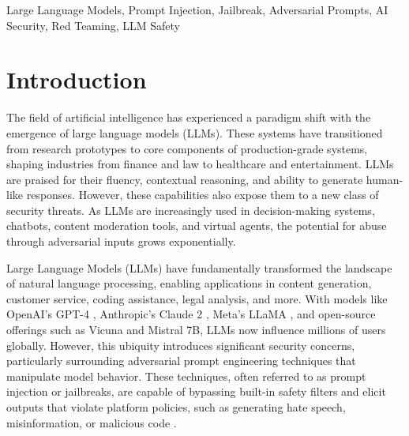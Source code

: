 \documentclass[conference]{IEEEtran}
\begin{document}
\begin{abstract}
Large Language Models (LLMs) are increasingly integrated into consumer and enterprise applications. Despite their capabilities, they remain susceptible to adversarial attacks such as prompt injection and jailbreaks that override alignment safeguards. This paper provides a systematic investigation of jailbreak strategies against various state-of-the-art LLMs. We categorize over 1,400 adversarial prompts, analyze their success against GPT-4, Claude 2, Mistral 7B, and Vicuna, and examine their generalizability and construction logic. We further propose layered mitigation strategies and recommend a hybrid red-teaming and sandboxing approach for robust LLM security.
\end{abstract}
\begin{IEEEkeywords}
 Large Language Models, Prompt Injection, Jailbreak, Adversarial Prompts, AI Security, Red Teaming, LLM Safety
\end{IEEEkeywords}

\section{Introduction}
The field of artificial intelligence has experienced a paradigm shift with the emergence of large language models (LLMs). These systems have transitioned from research prototypes to core components of production-grade systems, shaping industries from finance and law to healthcare and entertainment. LLMs are praised for their fluency, contextual reasoning, and ability to generate human-like responses. However, these capabilities also expose them to a new class of security threats. As LLMs are increasingly used in decision-making systems, chatbots, content moderation tools, and virtual agents, the potential for abuse through adversarial inputs grows exponentially. 

Large Language Models (LLMs) have fundamentally transformed the landscape of natural language processing, enabling applications in content generation, customer service, coding assistance, legal analysis, and more. With models like OpenAI's GPT-4 \cite{technicalreport17}, Anthropic’s Claude 2 \cite{anthropicjail18}, Meta’s LLaMA \cite{touvron2023llama50}, and open-source offerings such as Vicuna\cite{vicuna2023_51} and Mistral 7B\cite{mistral7b52}, LLMs now influence millions of users globally. However, this ubiquity introduces significant security concerns, particularly surrounding adversarial prompt engineering techniques that manipulate model behavior. These techniques, often referred to as prompt injection or jailbreaks, are capable of bypassing built-in safety filters and elicit outputs that violate platform policies, such as generating hate speech, misinformation, or malicious code \cite{liu2024promptinjection1}\cite{liu2024jailbreaking2}\cite{Benchmarking4}.
\end{document}
